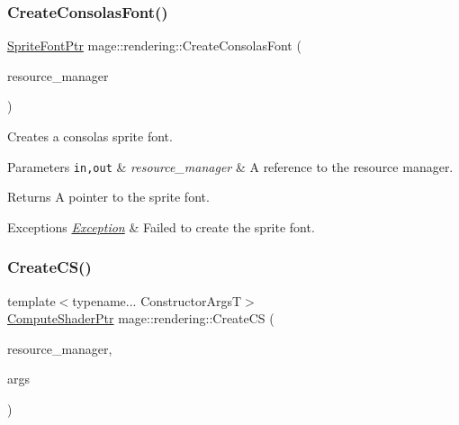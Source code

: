 \subsubsection{\texorpdfstring{Create\+Consolas\+Font()}{CreateConsolasFont()}}
{\footnotesize\ttfamily \mbox{\hyperlink{namespacemage_1_1rendering_ab2f34196c20422ca3692ad3f3bff3a5d}{Sprite\+Font\+Ptr}} mage\+::rendering\+::\+Create\+Consolas\+Font (\begin{DoxyParamCaption}\item[{\mbox{\hyperlink{classmage_1_1rendering_1_1_resource_manager}{Resource\+Manager}} \&}]{resource\+\_\+manager }\end{DoxyParamCaption})}

Creates a consolas sprite font.


\begin{DoxyParams}[1]{Parameters}
\mbox{\tt in,out}  & {\em resource\+\_\+manager} & A reference to the resource manager. \\
\hline
\end{DoxyParams}
\begin{DoxyReturn}{Returns}
A pointer to the sprite font. 
\end{DoxyReturn}

\begin{DoxyExceptions}{Exceptions}
{\em \mbox{\hyperlink{classmage_1_1_exception}{Exception}}} & Failed to create the sprite font. \\
\hline
\end{DoxyExceptions}
\mbox{\label{namespacemage_1_1rendering_abb0bc5a4c029c66cbf2f47ad6c1a692b}} 
\subsubsection{\texorpdfstring{Create\+C\+S()}{CreateCS()}}
{\footnotesize\ttfamily template$<$typename... Constructor\+ArgsT$>$ \\
\mbox{\hyperlink{namespacemage_1_1rendering_ab3dc9f2114f2e9255b91d9c051da52ea}{Compute\+Shader\+Ptr}} mage\+::rendering\+::\+Create\+CS (\begin{DoxyParamCaption}\item[{\mbox{\hyperlink{classmage_1_1rendering_1_1_resource_manager}{Resource\+Manager}} \&}]{resource\+\_\+manager,  }\item[{Constructor\+ArgsT \&\&...}]{args }\end{DoxyParamCaption})}

